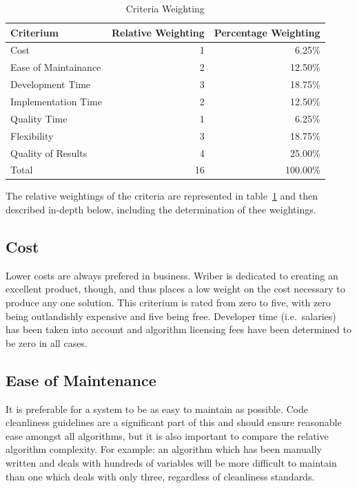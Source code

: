 \documentclass[12pt]{article}
\begin{document}
\begin{table}[ht]
\caption{Criteria Weighting}
\label{tbl:weighting}
\centering
\begin{tabular}{|l|r|r|}
	\hline
	Criterium & Relative Weighting & Percentage Weighting \\
	\hline
	\hline
	Cost                 &  1 &   6.25\% \\
	Ease of Maintainance &  2 &  12.50\% \\
	Development Time     &  3 &  18.75\% \\
	Implementation Time  &  2 &  12.50\% \\
	Quality Time         &  1 &   6.25\% \\
	Flexibility          &  3 &  18.75\% \\
	Quality of Results   &  4 &  25.00\% \\
	\hline
	\hline
	Total                & 16 & 100.00\% \\
	\hline
\end{tabular}
\end{table}

The relative weightings of the criteria are represented in table~\ref{tbl:weighting} and then described in-depth below, including the determination of thee weightings.

\subsection{Cost}
Lower costs are always prefered in business. Wriber is dedicated to creating an excellent product, though, and thus places a low weight on the cost necessary to produce any one solution. This criterium is rated from zero to five, with zero being outlandishly expensive and five being free. Developer time (i.e.\ salaries) has been taken into account and algorithm licensing fees have been determined to be zero in all cases.

\subsection{Ease of Maintenance}
It is preferable for a system to be as easy to maintain as possible. Code cleanliness guidelines are a significant part of this and should ensure reasonable ease amongst all algorithms, but it is also important to compare the relative algorithm complexity. For example: an algorithm which has been manually written and deals with hundreds of variables will be more difficult to maintain than one which deals with only three, regardless of cleanliness standards.
\end{document}
